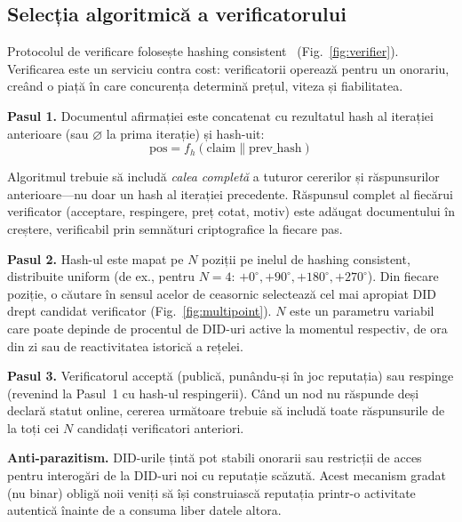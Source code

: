 \documentclass[11pt,a4paper,twocolumn]{article}
\begin{document}
\subsection{Selecția algoritmică a verificatorului}

Protocolul de verificare folosește hashing consistent~\cite{karger1997} (Fig.~\ref{fig:verifier}). Verificarea este un serviciu contra cost: verificatorii operează pentru un onorariu, creând o piață în care concurența determină prețul, viteza și fiabilitatea.

\textbf{Pasul 1.} Documentul afirmației este concatenat cu rezultatul hash al iterației anterioare (sau $\varnothing$ la prima iterație) și hash-uit:
\begin{equation}
\text{pos} = f_h(\text{claim} \| \text{prev\_hash})
\label{eq:hash}
\end{equation}

Algoritmul trebuie să includă \emph{calea completă} a tuturor cererilor și răspunsurilor anterioare---nu doar un hash al iterației precedente. Răspunsul complet al fiecărui verificator (acceptare, respingere, preț cotat, motiv) este adăugat documentului în creștere, verificabil prin semnături criptografice la fiecare pas.

\textbf{Pasul 2.} Hash-ul este mapat pe $N$ poziții pe inelul de hashing consistent, distribuite uniform (de ex., pentru $N=4$: $+0^{\circ}, +90^{\circ}, +180^{\circ}, +270^{\circ}$). Din fiecare poziție, o căutare în sensul acelor de ceasornic selectează cel mai apropiat DID drept candidat verificator (Fig.~\ref{fig:multipoint}). $N$ este un parametru variabil care poate depinde de procentul de DID-uri active la momentul respectiv, de ora din zi sau de reactivitatea istorică a rețelei.

\textbf{Pasul 3.} Verificatorul acceptă (publică, punându-și în joc reputația) sau respinge (revenind la Pasul~1 cu hash-ul respingerii). Când un nod nu răspunde deși declară statut online, cererea următoare trebuie să includă toate răspunsurile de la toți cei $N$ candidați verificatori anteriori.

\textbf{Anti-parazitism.} DID-urile țintă pot stabili onorarii sau restricții de acces pentru interogări de la DID-uri noi cu reputație scăzută. Acest mecanism gradat (nu binar) obligă noii veniți să își construiască reputația printr-o activitate autentică înainte de a consuma liber datele altora.
\end{document}
